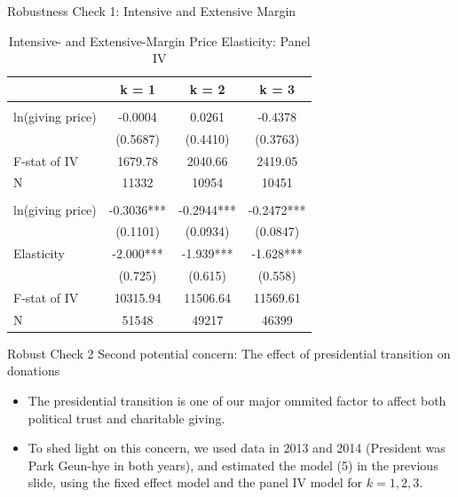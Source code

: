 \documentclass[
  ignorenonframetext,
]{beamer}
\providecommand{\tightlist}{%
  \setlength{\itemsep}{0pt}\setlength{\parskip}{0pt}}
\begin{document}
\begin{frame}{Robustness Check 1: Intensive and Extensive Margin}
\protect\hypertarget{robustness-check-1-intensive-and-extensive-margin}{}
\begin{table}

\caption{\label{tab:kablePanelIVEstimateElasticityIntExt}Intensive- and Extensive-Margin Price Elasticity: Panel IV}
\centering
\fontsize{9}{11}\selectfont
\begin{tabular}[t]{lccc}
\toprule
 & k = 1 & k = 2 & k = 3\\
\midrule
\addlinespace[0.3em]
\multicolumn{4}{l}{\textbf{Intensive Margin}}\\
\hspace{1em}ln(giving price) & -0.0004 & 0.0261 & -0.4378\\
\hspace{1em} & (0.5687) & (0.4410) & (0.3763)\\
\hspace{1em}F-stat of IV & 1679.78 & 2040.66 & 2419.05\\
\hspace{1em}N & 11332 & 10954 & 10451\\
\addlinespace[0.3em]
\multicolumn{4}{l}{\textbf{Extensive Margin}}\\
\hspace{1em}ln(giving price) & -0.3036*** & -0.2944*** & -0.2472***\\
\hspace{1em} & (0.1101) & (0.0934) & (0.0847)\\
\hspace{1em}Elasticity & -2.000*** & -1.939*** & -1.628***\\
\hspace{1em} & (0.725) & (0.615) & (0.558)\\
\hspace{1em}F-stat of IV & 10315.94 & 11506.64 & 11569.61\\
\hspace{1em}N & 51548 & 49217 & 46399\\
\bottomrule
\end{tabular}
\end{table}
\end{frame}

\begin{frame}{Robust Check 2}
\protect\hypertarget{robust-check-2}{}
Second potential concern: The effect of presidential transition on
donations

\begin{itemize}
\tightlist
\item
  The presidential transition is one of our major ommited factor to
  affect both political trust and charitable giving.
\item
  To shed light on this concern, we used data in 2013 and 2014
  (President was Park Geun-hye in both years), and estimated the model
  (5) in the previous slide, using the fixed effect model and the panel
  IV model for \(k = 1, 2, 3\).
\end{itemize}
\end{frame}
\end{document}
